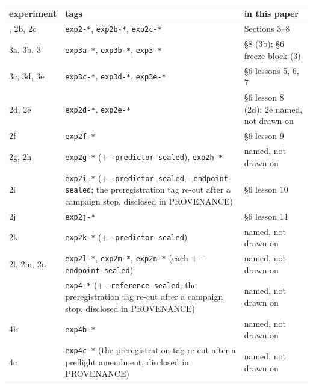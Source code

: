 \begin{longtable}[]{@{}
  >{\raggedright\arraybackslash}p{}
  >{\raggedright\arraybackslash}p{}
  >{\raggedright\arraybackslash}p{}@{}}
\toprule\noalign{}
\begin{minipage}[b]{\linewidth}\raggedright
experiment
\end{minipage} & \begin{minipage}[b]{\linewidth}\raggedright
tags
\end{minipage} & \begin{minipage}[b]{\linewidth}\raggedright
in this paper
\end{minipage} \\
\midrule\noalign{}
\endhead
\bottomrule\noalign{}
\endlastfoot
2, 2b, 2c & \texttt{exp2-*}, \texttt{exp2b-*}, \texttt{exp2c-*} & Sections 3--8 \\
3a, 3b, 3 & \texttt{exp3a-*}, \texttt{exp3b-*}, \texttt{exp3-*} & §8 (3b); §6 freeze block (3) \\
3c, 3d, 3e & \texttt{exp3c-*}, \texttt{exp3d-*}, \texttt{exp3e-*} & §6 lessons 5, 6, 7 \\
2d, 2e & \texttt{exp2d-*}, \texttt{exp2e-*} & §6 lesson 8 (2d); 2e named, not drawn on \\
2f & \texttt{exp2f-*} & §6 lesson 9 \\
2g, 2h & \texttt{exp2g-*} (+ \texttt{-predictor-sealed}), \texttt{exp2h-*} & named, not drawn on \\
2i & \texttt{exp2i-*} (+ \texttt{-predictor-sealed}, \texttt{-endpoint-sealed}; the preregistration tag re-cut after a campaign stop, disclosed in PROVENANCE) & §6 lesson 10 \\
2j & \texttt{exp2j-*} & §6 lesson 11 \\
2k & \texttt{exp2k-*} (+ \texttt{-predictor-sealed}) & named, not drawn on \\
2l, 2m, 2n & \texttt{exp2l-*}, \texttt{exp2m-*}, \texttt{exp2n-*} (each + \texttt{-endpoint-sealed}) & named, not drawn on \\
4 & \texttt{exp4-*} (+ \texttt{-reference-sealed}; the preregistration tag re-cut after a campaign stop, disclosed in PROVENANCE) & named, not drawn on \\
4b & \texttt{exp4b-*} & named, not drawn on \\
4c & \texttt{exp4c-*} (the preregistration tag re-cut after a preflight amendment, disclosed in PROVENANCE) & named, not drawn on \\

\end{longtable}
